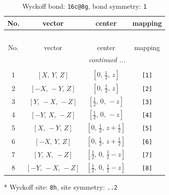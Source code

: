 \documentclass[fleqn,8pt]{jsarticle}
\begin{document}
\renewcommand{\arraystretch}{1.2}
\begin{longtable}{cccc}
\caption{Wyckoff bond: {\tt 16c@8g}, bond symmetry: {\tt 1}}
 \\
 \hline \hline
No. & vector & center & mapping \\ \hline \endfirsthead

\multicolumn{3}{l}{\tablename\ \thetable{}} \\
 \hline \hline
No. & vector & center & mapping \\ \hline \endhead

 \hline \hline
\multicolumn{3}{r}{\footnotesize\it continued ...} \\ \endfoot

 \hline \hline
\multicolumn{3}{r}{} \\ \endlastfoot

1 & $\left[ X,\, Y,\, Z \right]$ & $\left[ 0,\, \frac{1}{2},\, z \right]$ & {\tt [1]} \\ \hline
2 & $\left[ - X,\, - Y,\, Z \right]$ & $\left[ 0,\, \frac{1}{2},\, z \right]$ & {\tt [2]} \\ \hline
3 & $\left[ Y,\, - X,\, - Z \right]$ & $\left[ \frac{1}{2},\, 0,\, - z \right]$ & {\tt [3]} \\ \hline
4 & $\left[ - Y,\, X,\, - Z \right]$ & $\left[ \frac{1}{2},\, 0,\, - z \right]$ & {\tt [4]} \\ \hline
5 & $\left[ X,\, - Y,\, Z \right]$ & $\left[ 0,\, \frac{1}{2},\, z + \frac{1}{2} \right]$ & {\tt [5]} \\ \hline
6 & $\left[ - X,\, Y,\, Z \right]$ & $\left[ 0,\, \frac{1}{2},\, z + \frac{1}{2} \right]$ & {\tt [6]} \\ \hline
7 & $\left[ Y,\, X,\, - Z \right]$ & $\left[ \frac{1}{2},\, 0,\, \frac{1}{2} - z \right]$ & {\tt [7]} \\ \hline
8 & $\left[ - Y,\, - X,\, - Z \right]$ & $\left[ \frac{1}{2},\, 0,\, \frac{1}{2} - z \right]$ & {\tt [8]} \\
\end{longtable}
* Wyckoff site: {\tt 8h}, site symmetry: {\tt ..2}
\renewcommand{\arraystretch}{1.2}
\end{document}
